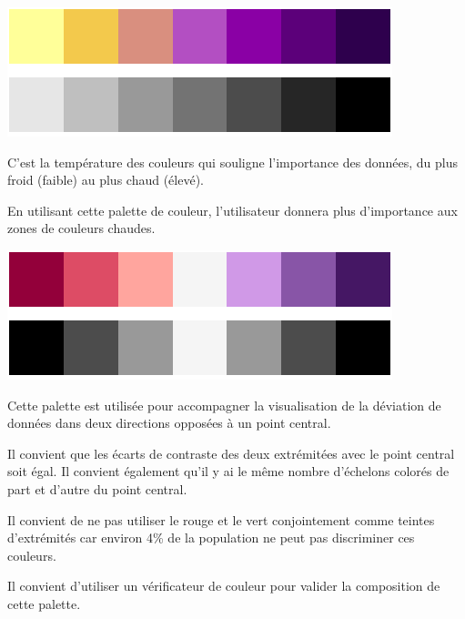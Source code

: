 \documentclass[a4paper,12pt]{article}
\begin{document}
\begin{multicols}{2}
\begin{center}
\includegraphics[width=.9\linewidth]{./img/palette-thermique.pdf}
\end{center}

C'est la température des couleurs qui souligne l'importance des données, du plus froid (faible) au plus chaud (élevé). \autocite{REF???}

En utilisant cette palette de couleur, l'utilisateur donnera plus d'importance aux zones de couleurs chaudes. \autocite{REF???}

\begin{center}
\includegraphics[width=.9\linewidth]{./img/palette-divergente.pdf}
\end{center}

Cette palette est utilisée pour accompagner la visualisation de la déviation de données dans deux directions opposées à un point central. \autocite{wilkeColorScales2019}

Il convient que les écarts de contraste des deux extrémitées avec le point central soit égal. Il convient également qu'il y ai le même nombre d'échelons colorés de part et d'autre du point central. \autocite{wilkeColorScales2019}

Il convient de ne pas utiliser le rouge et le vert conjointement comme teintes d'extrémités car environ 4\% de la population ne peut pas discriminer ces couleurs. \autocite{schwabishCenteringAccessibilityData2022a}

Il convient d'utiliser un vérificateur de couleur pour valider la composition de cette palette.\autocite{andreaskrauseBestPracticesData2024}


\end{multicols}
\end{document}
